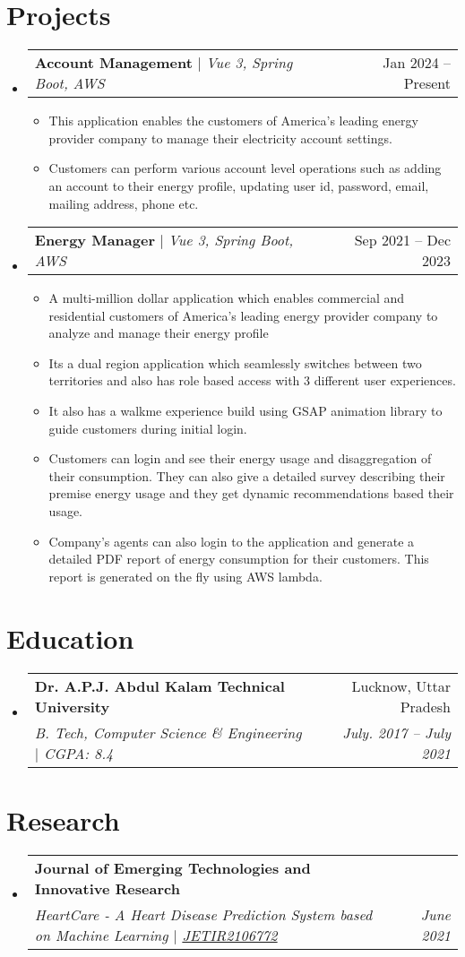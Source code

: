 \documentclass[letterpaper,11pt]{article}
\makeatletter
\newcommand{\resumeItem}[1]{
  \item\small{
    {#1 \vspace{-2pt}}
  }
}
\newcommand{\resumeSubheading}[4]{
  \vspace{-2pt}\item
    \begin{tabular*}{0.97\textwidth}[t]{l@{\extracolsep{\fill}}r}
      \textbf{#1} & #2 \\
      \textit{\small#3} & \textit{\small #4} \\
    \end{tabular*}\vspace{-7pt}
}
\newcommand{\resumeProjectHeading}[2]{
    \item
    \begin{tabular*}{0.97\textwidth}{l@{\extracolsep{\fill}}r}
      \small#1 & #2 \\
    \end{tabular*}\vspace{-7pt}
}
\newcommand{\resumeSubHeadingListStart}{\begin{itemize}[leftmargin=0.15in, label={}]}
\newcommand{\resumeSubHeadingListEnd}{\end{itemize}}
\newcommand{\resumeItemListStart}{\begin{itemize}}
\newcommand{\resumeItemListEnd}{\end{itemize}\vspace{-5pt}}
\makeatother
\begin{document}
\section{Projects}
    \resumeSubHeadingListStart
      \resumeProjectHeading
          {\textbf{Account Management} $|$ \emph{Vue 3, Spring Boot, AWS}}{Jan 2024 -- Present}
          \resumeItemListStart
            \resumeItem{This application enables the customers of America's leading energy provider company to manage their electricity account settings.}
            \resumeItem{Customers can perform various account level operations such as adding an account to their energy profile, updating user id, password, email, mailing address, phone etc.}
          \resumeItemListEnd
      \resumeProjectHeading
          {\textbf{Energy Manager} $|$ \emph{Vue 3, Spring Boot, AWS}}{Sep 2021 -- Dec 2023}
          \resumeItemListStart
            \resumeItem{A multi-million dollar application which enables commercial and residential customers of America's leading energy provider company to analyze and manage their energy profile}
            \resumeItem{Its a dual region application which seamlessly switches between two territories and also has role based access with 3 different user experiences.}
            \resumeItem{It also has a walkme experience build using GSAP animation library to guide customers during initial login.}
            \resumeItem{Customers can login and see their energy usage and disaggregation of their consumption. They can also give a detailed survey describing their premise energy usage and they get dynamic recommendations based their usage.}
            \resumeItem{Company's agents can also login to the application and generate a detailed PDF report of energy consumption for their customers. This report is generated on the fly using AWS lambda.}
          \resumeItemListEnd
    \resumeSubHeadingListEnd


\section{Education}
  \resumeSubHeadingListStart
    \resumeSubheading
      {Dr. A.P.J. Abdul Kalam Technical University}{Lucknow, Uttar Pradesh}
      {B. Tech, Computer Science \& Engineering $|$ CGPA: 8.4}{July. 2017 -- July 2021}
  \resumeSubHeadingListEnd

\section{Research}
  \resumeSubHeadingListStart
    \resumeSubheading
      {Journal of Emerging Technologies and Innovative Research}{}
      {HeartCare - A Heart Disease Prediction System based on Machine Learning $|$ \href{http://www.jetir.org/papers/JETIR2106772.pdf}
      {\underline{JETIR2106772}} 
    }{June 2021}
  \resumeSubHeadingListEnd
\end{document}
